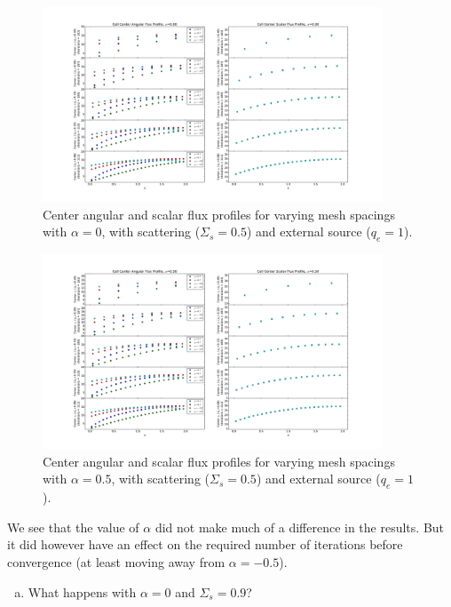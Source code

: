 \documentclass[10pt]{article}
\begin{document}
\begin{figure}[H]
    \centering
    \includegraphics[width=0.9\textwidth]{Figures/FluxProfile_a=0_source}
    \caption{Center angular and scalar flux profiles for varying mesh spacings with $\alpha = 0$, with scattering ($\Sigma_s = 0.5$) and external source ($q_e=1$).}
    \label{fig9}
\end{figure}

\begin{figure}[H]
    \centering
    \includegraphics[width=0.9\textwidth]{Figures/FluxProfile_a=05_source}
    \caption{Center angular and scalar flux profiles for varying mesh spacings with $\alpha = 0.5$, with scattering ($\Sigma_s = 0.5$) and external source ($q_e=1$).}
    \label{fig10}
\end{figure}

\newpage
We see that the value of $\alpha$ did not make much of a difference in the results. But it did however have an effect on the required number of iterations before convergence (at least moving away from $\alpha = -0.5$).

%
%
%

\vspace{10pt}
\begin{enumerate}[(d)]
\item What happens with $\alpha = 0$ and $\Sigma_s = 0.9$?
\end{enumerate}
\end{document}
